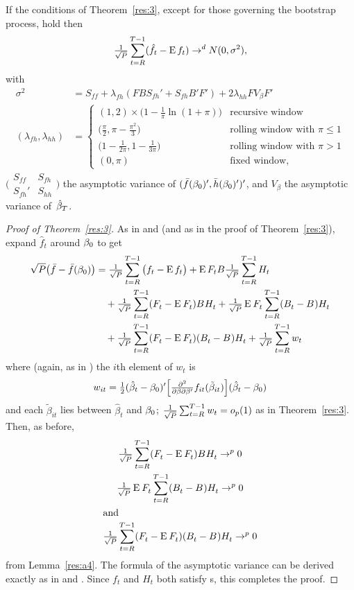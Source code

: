 \documentclass[12pt,fleqn]{article}
\begin{document}
\begin{lema}\label{res:a5}
  If the conditions of Theorem~\ref{res:3}, except for those governing
  the bootstrap process, hold then
  \begin{equation}
    \tfrac{1}{\sqrt{P}} \sum_{t=R}^{T-1}
    (\hat f_t - \operatorname{E} f_t) \to^d N(0, \sigma^2),
  \end{equation}
  with
  \begin{align}
  \sigma^2 &= S_{ff} + \lambda_{fh} (F B S_{fh}' + S_{fh} B' F') + 2 \lambda_{hh} F V_\beta F' \\
  (\lambda_{fh}, \lambda_{hh}) &=
  \begin{cases}
    (1, 2) \times \big(1 - \tfrac{1}{\pi} \ln(1 + \pi)\big)
      & \text{recursive window} \\
    \big(\tfrac{\pi}{2}, \pi - \tfrac{\pi^2}{3}\big)
      & \text{rolling window with $\pi \leq 1$} \\
    \big(1 - \tfrac{1}{2\pi}, 1 - \tfrac{1}{3\pi}\big)
      & \text{rolling window with $\pi > 1$} \\
    (0, \pi) & \text{fixed window},
  \end{cases}
  \end{align}
  $\Big(\begin{smallmatrix}S_{ff} & S_{fh} \\ S_{fh}' &
    S_{hh} \end{smallmatrix} \Big)$ the asymptotic variance of $(\bar
  f(\btrue)', \bar h(\btrue)')'$, and $V_\beta$ the asymptotic
  variance of~$\btrue[*]$.
\end{lema}

\begin{proof}[Proof of Theorem~\ref{res:3}]
  As in \citet{Wes:96} and \citet{WeM:98} (and as in the proof of
  Theorem~\ref{res:3}), expand $\hat f_t$ around
  $\btrue$ to get
  \begin{align*}
    \sqrt{P} \big(\bar{f} - \bar{f}(\btrue)\big) &= \oclt{t}
    \big(f_t - \E f_t\big) +
    \E F_t B \oclt{t} H_t \\
    & \quad + \WesA + \WesB \\ & \quad + \WesC + \oclt{t} w_t
  \end{align*}
  where (again, as in \citealp{Wes:96}) the $i$th element of $w_t$ is
  \begin{equation*}
    w_{it} = \tfrac12 (\hat\beta_t - \btrue)'
    \Big[\tfrac{\partial^2}{\partial \beta \partial\beta'}
    f_{it}(\tilde\beta_{it}) \Big]
    (\hat\beta_t - \btrue)
  \end{equation*}
  and each $\tilde\beta_{it}$ lies between $\hat\beta_t$ and
  $\btrue$; $\tfrac{1}{\sqrt{P}} \sum_{t=R}^{T-1} w_t = o_{p}(1)$ as in Theorem~\ref{res:3}.
  Then, as before,
  \begin{gather}
    \tfrac{1}{\sqrt{P}} \sum_{t=R}^{T-1} (F_t^{} - \operatorname{E}^{} F_t^{}) B^{} H_t^{} \to^{p} 0 \label{eq:11} \\
    \tfrac{1}{\sqrt{P}} \operatorname{E}^{} F_t^{} \sum_{t=R}^{T-1} (B_t^{} - B^{}) H_t^{} \to^{p} 0 \label{eq:12}\\
  \intertext{and}
    \tfrac{1}{\sqrt{P}} \sum_{t=R}^{T-1} (F_t^{} - \operatorname{E}^{} F_t^{}) (B_t^{} - B^{}) H_t^{} \to^{p} 0 \label{eq:13}
  \end{gather}
  from Lemma~\ref{res:a4}.  The formula of the asymptotic variance can
  be derived exactly as in \citet{Wes:96} and \citet{WeM:98}. Since
  $f_t$ and $H_t$ both satisfy \clt s, this completes the
  proof.
\end{proof}


\end{document}
